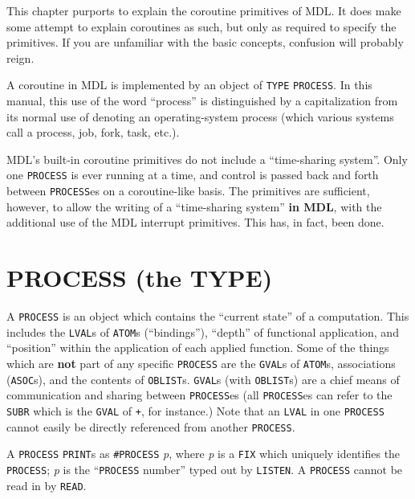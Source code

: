 \documentclass[a4paper]{scrbook}
\begin{document}
This chapter purports to explain the coroutine primitives of MDL. It does make some attempt to explain coroutines as such,
but only as required to specify the primitives. If you are unfamiliar with the basic concepts, confusion will probably
reign.

A coroutine in MDL is implemented by an object of \texttt{TYPE} \texttt{PROCESS}. In this manual, this use of the word
``process'' is distinguished by a capitalization from its normal use of denoting an operating-system process (which various
systems call a process, job, fork, task, etc.).

MDL's built-in coroutine primitives do not include a ``time-sharing system''. Only one \texttt{PROCESS} is ever running at
a time, and control is passed back and forth between \texttt{PROCESS}es on a coroutine-like basis. The primitives are
sufficient, however, to allow the writing of a ``time-sharing system'' \textbf{in MDL}, with the additional use of the MDL
interrupt primitives. This has, in fact, been done.

\section{PROCESS (the TYPE)}\label{process-the-type}

A \texttt{PROCESS} is an object which contains the ``current state'' of a computation. This
includes the \texttt{LVAL}s of \texttt{ATOM}s (``bindings''), ``depth'' of functional application, and
``position'' within the application of each applied function. Some of the things which are \textbf{not} part of any
specific \texttt{PROCESS} are the \texttt{GVAL}s of \texttt{ATOM}s, associations
(\texttt{ASOC}s), and the contents of \texttt{OBLIST}s. \texttt{GVAL}s (with
\texttt{OBLIST}s) are a chief means of communication and sharing between \texttt{PROCESS}es (all \texttt{PROCESS}es can
refer to the \texttt{SUBR} which is the \texttt{GVAL} of \texttt{+}, for instance.) Note that an \texttt{LVAL} in one
\texttt{PROCESS} cannot easily be directly referenced from another \texttt{PROCESS}.

A \texttt{PROCESS} \texttt{PRINT}s as \texttt{\#PROCESS} \emph{p}, where \emph{p} is a \texttt{FIX} which uniquely
identifies the \texttt{PROCESS}; \emph{p} is the ``\texttt{PROCESS} number'' typed out by
\texttt{LISTEN}. A \texttt{PROCESS} cannot be read in by \texttt{READ}.
\end{document}
